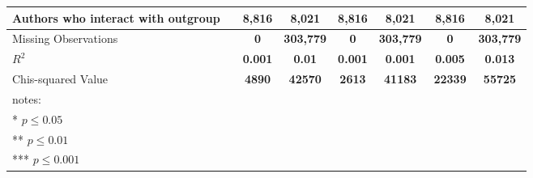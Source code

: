 \documentclass[letterpaper]{article}
\begin{document}
\begin{table*}
\begin{threeparttable}
\begin{adjustbox}{max width=\textwidth}
\begin{tabular}{|p{3.5cm}|c|cccc|cccc|cccc|cccc|cccc|cccc|}
Authors who interact with outgroup &       & \multicolumn{4}{c|}{\textbf{8,816}} & \multicolumn{4}{c|}{\textbf{8,021}} & \multicolumn{4}{c|}{\textbf{8,816}} & \multicolumn{4}{c|}{\textbf{8,021}} & \multicolumn{4}{c|}{\textbf{8,816}} & \multicolumn{4}{c|}{\textbf{8,021}} \\\hline
Missing Observations &       & \multicolumn{4}{c|}{\textbf{0}} & \multicolumn{4}{c|}{\textbf{303,779}} & \multicolumn{4}{c|}{\textbf{0}} & \multicolumn{4}{c|}{\textbf{303,779}} & \multicolumn{4}{c|}{\textbf{0}} & \multicolumn{4}{c|}{\textbf{303,779}} \\\hline
$R^2$ &       & \multicolumn{4}{c|}{\textbf{0.001}} & \multicolumn{4}{c|}{\textbf{0.01}} & \multicolumn{4}{c|}{\textbf{0.001}} & \multicolumn{4}{c|}{\textbf{0.001}} & \multicolumn{4}{c|}{\textbf{0.005}} & \multicolumn{4}{c|}{\textbf{0.013}} \\\hline
Chis-squared Value &       & \multicolumn{4}{c|}{\textbf{4890}} & \multicolumn{4}{c|}{\textbf{42570}} & \multicolumn{4}{c|}{\textbf{2613}} & \multicolumn{4}{c|}{\textbf{41183}} & \multicolumn{4}{c|}{\textbf{22339}} & \multicolumn{4}{c|}{\textbf{55725}} \\\hline
\bottomrule
\multicolumn{18}{l}{notes:}{}\\
\multicolumn{18}{l}{* $p \leq 0.05$}\\
\multicolumn{18}{l}{** $p \leq 0.01$}\\
\multicolumn{18}{l}{*** $p \leq 0.001$}\\
\end{tabular}
\end{adjustbox}
\end{threeparttable}
\label{tab:regrtab}
\end{table*}
\end{document}
